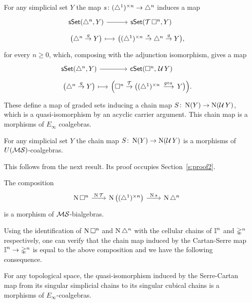 For any simplicial set $Y$ the map $s \colon (\triangle^1)^{\times n} \to \triangle^n$ induces a map
\begin{equation*}
\begin{tikzcd}[column sep = small, row sep=tiny]
\sSet(\simplex^n, Y) \arrow[r] &
\sSet(\T \cube^n, Y) \\
\big( \simplex^n \stackrel{g}{\to} Y \big) \arrow[r, maps to] &
\big(\scube{n} \stackrel{s}{\to} \simplex^n \stackrel{g}{\to} Y \big),
\end{tikzcd}
\end{equation*}
for every $n \geq 0$, which, composing with the adjunction isomorphism, gives a map
\begin{equation*}
\begin{tikzcd}[column sep = small, row sep=tiny]
\sSet(\simplex^n, Y) \arrow[r] &
\cSet(\cube^n,\, \U Y) \\
\big( \simplex^n \stackrel{g}{\to} Y \big) \arrow[r, maps to] &
\Big(\cube^n \stackrel{\T}{\to} \big(\scube{n} \stackrel{g \circ s\,}{\, \longrightarrow\, } Y \big)\Big).
\end{tikzcd}
\end{equation*}
These define a map of graded sets inducing a chain map $S \colon \operatorname{N}(Y) \to \operatorname{N}(\operatorname{\mathcal{U}} Y)$, which is a quasi-isomorphism by an acyclic carrier argument.
This chain map is a morphisms of $E_\infty$ coalgebras.

\begin{theorem} \label{t:comparison}
	For any simplicial set $Y$ the chain map $S \colon \operatorname{N}(Y) \to \operatorname{N}(\operatorname{\mathcal{U}} Y)$ is a morphisms of $U(\mathcal{MS})$-coalgebras.
\end{theorem}

This follows from the next result.
Its proof occupies Section~\ref{s:proof2}.

\begin{lemma}
	The composition
	\begin{equation*}
	\begin{tikzcd}[column sep=normal]
	\chains \cube^n \arrow[r, "\chains \T"] &[-3pt] \chains \big( \scube{n} \big) \arrow[r, "\chains s"] &[-3pt] \chains \simplex^n
	\end{tikzcd}
	\end{equation*}
	is a morphism of $\mathcal{MS}$-bialgebras.
\end{lemma}

Using the identification of $\operatorname{N} \square^n$ and $\operatorname{N} \triangle^n$ with the cellular chains of $\bm{\mathbb{I}}^n$ and $\mathbb{\Delta}^n$ respectively, one can verify that the chain map induced by the Cartan-Serre map $\bm{\mathbb{I}}^n \to \mathbb{\Delta}^n$ is equal to the above composition and we have the following consequence.

\begin{corollary}
	For any topological space, the quasi-isomorphism induced by the Serre-Cartan map from its singular simplicial chains to its singular cubical chains is a morphisms of $E_\infty$-coalgebras.
\end{corollary}